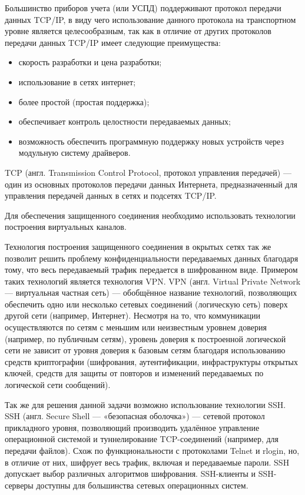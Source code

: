 Большинство приборов учета (или УСПД) поддерживают протокол передачи данных TCP/IP, в виду чего использование данного протокола на транспортном уровне является целесообразным, так как в отличие от других протоколов передачи данных TCP/IP имеет следующие преимущества:

\begin{itemize}
 \item скорость разработки и цена разработки;
 \item использование в сетях интернет;
 \item более простой (простая поддержка);
 \item обеспечивает контроль целостности передаваемых данных;
 \item возможность обеспечить программную поддержку новых устройств через модульную систему драйверов.
\end{itemize}

TCP (англ. Transmission Control Protocol, протокол управления передачей) — один из основных протоколов передачи данных Интернета, предназначенный для управления передачей данных в сетях и подсетях TCP/IP\cite{tcp}.

Для обеспечения защищенного соединения необходимо использовать технологии построения виртуальных каналов. 

Технология построения защищенного соединения в окрытых сетях так же позволит решить проблему конфиденциальности передаваемых данных благодаря тому, что весь передаваемый трафик передается в шифрованном виде. Примером таких технологий является технология VPN. VPN (англ. Virtual Private Network — виртуальная частная сеть\cite{vpn}) — обобщённое название технологий, позволяющих обеспечить одно или несколько сетевых соединений (логическую сеть) поверх другой сети (например, Интернет). Несмотря на то, что коммуникации осуществляются по сетям с меньшим или неизвестным уровнем доверия (например, по публичным сетям), уровень доверия к построенной логической сети не зависит от уровня доверия к базовым сетям благодаря использованию средств криптографии (шифрования, аутентификации, инфраструктуры открытых ключей, средств для защиты от повторов и изменений передаваемых по логической сети сообщений).

Так же для решения данной задачи возможно использование технологии SSH. SSH (англ. Secure Shell — «безопасная оболочка»\cite{ssh}) — сетевой протокол прикладного уровня, позволяющий производить удалённое управление операционной системой и туннелирование TCP-соединений (например, для передачи файлов). Схож по функциональности с протоколами Telnet и rlogin, но, в отличие от них, шифрует весь трафик, включая и передаваемые пароли. SSH допускает выбор различных алгоритмов шифрования. SSH-клиенты и SSH-серверы доступны для большинства сетевых операционных систем. 

